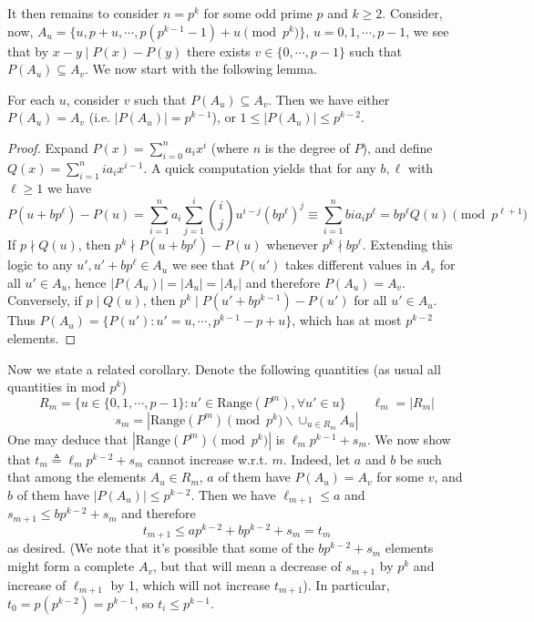 \documentclass[11pt,a4paper]{article}
\begin{document}
\begin{enumerate}
        It then remains to consider $n=p^k$ for some odd prime $p$ and $k\ge 2$. 
        Consider, now, $A_u = \{u, p + u, \cdots, p(p^{k-1}-1) + u\pmod{p^k}\}$, $u=0, 1, \cdots, p -1$, 
        we see that by $x-y\mid P(x) - P(y)$ there exists $v\in \{0, \cdots, p - 1\}$ such that $P(A_u)\subseteq A_v$. 
        We now start with the following lemma. 
        
        \begin{lemma}
        	For each $u$, consider $v$ such that $P(A_u)\subseteq A_v$. 
        	Then we have either $P(A_u) = A_v$ (i.e. $|P(A_u)| = p^{k-1}$), or $1\le |P(A_u)|\le p^{k-2}$. 
        \end{lemma}
        
        \begin{proof}
        	Expand $P(x) = \sum_{i=0}^n a_ix^i$ (where $n$ is the degree of $P$), 
        	and define $Q(x) = \sum_{i=1}^n ia_ix^{i-1}$. 
        	A quick computation yields that for any $b, \ell$ with $\ell\ge 1$ we have 
        	\[
        	P(u + bp^{\ell}) - P(u)
        	=\sum_{i=1}^n a_i\sum_{j=1}^i \binom{i}{j}u^{i - j}(bp^{\ell})^j
        	\equiv \sum_{i=1}^n bia_ip^{\ell} 
        	=bp^{\ell}Q(u)\pmod{p^{\ell + 1}}
        	\]
        	If $p\nmid Q(u)$, then $p^k\nmid P(u + bp^{\ell}) - P(u)$ whenever $p^k\nmid bp^{\ell}$. 
        	Extending this logic to any $u', u'+bp^{\ell}\in A_u$ we see that $P(u')$ takes different values in $A_v$ for all $u'\in A_u$, hence $|P(A_u)|=|A_u|=|A_v|$ 
        	and therefore $P(A_u) = A_v$. 
        	Conversely, if $p\mid Q(u)$, 
        	then $p^k\mid P(u' + bp^{k-1}) - P(u')$ for all $u'\in A_u$. 
        	Thus $P(A_u) = \{P(u'): u'=u, \cdots, p^{k-1} - p + u\}$, 
        	which has at most $p^{k-2}$ elements. 
        \end{proof}
        
        Now we state a related corollary. Denote the following quantities (as usual all quantities in mod $p^k$)
        \[
        R_m = \{u\in \{0, 1, \cdots, p-1\}: u'\in\text{Range}(P^m), \forall u'\in u\}
        \qquad 
        \ell_m = |R_m|
        \]\[
        s_m = |\text{Range}(P^m)\pmod{p^k}\backslash \cup_{u\in R_m} A_u|
        \]
        One may deduce that $|\text{Range}(P^m)\pmod{p^k}|$ is $\ell_m p^{k-1} + s_m$. 
        We now show that $t_m\triangleq \ell_m p^{k-2} + s_m$ cannot increase w.r.t. $m$. 
        Indeed, let $a$ and $b$ be such that among the elements $A_u\in R_m$, 
        $a$ of them have $P(A_u)=A_v$ for some $v$, 
        and $b$ of them have $|P(A_u)|\le p^{k-2}$. 
        Then we have $\ell_{m+1}\le a$ and $s_{m+1}\le bp^{k-2} + s_{m}$ and therefore 
        \[
        t_{m+1} \le ap^{k-2} + bp^{k-2} + s_m =t_m
        \]
        as desired. 
        (We note that it's possible that some of the $bp^{k-2} + s_{m}$ elements might form a complete $A_v$, 
        but that will mean a decrease of $s_{m+1}$ by $p^k$ and increase of $\ell_{m+1}$ by 1, which will not increase $t_{m+1}$). 
        In particular, $t_0 = p(p^{k-2}) = p^{k-1}$, so $t_i\le p^{k-1}$. 
        

\end{enumerate}
\end{document}
